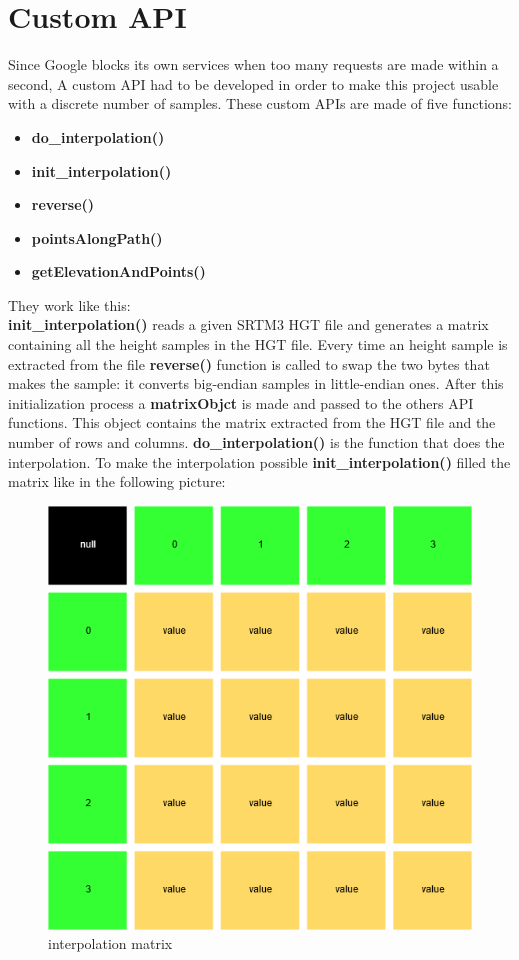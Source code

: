 \documentclass[peerreview]{IEEEtran}
\begin{document}
\section{Custom API}
Since Google blocks its own services when too many requests are made within a second, A custom API had to be developed in order to make this project usable with a discrete number of samples.
These custom APIs are made of five functions:
\begin{itemize}
\item \textbf{do\_interpolation()}
\item \textbf{init\_interpolation()}
\item \textbf{reverse()}
\item \textbf{pointsAlongPath()}
\item \textbf{getElevationAndPoints()}
\end{itemize}
They work like this:\\
\textbf{init\_interpolation()} reads a given SRTM3 HGT file and generates a matrix containing all the height samples in the HGT file. Every time an height sample is extracted from the file \textbf{reverse()} function is called to swap the two bytes that makes the sample: it converts big-endian samples in little-endian ones. After this initialization process a \textbf{matrixObjct} is made and passed to the others API functions. This object contains the matrix extracted from the HGT file and the number of rows and columns.
\textbf{do\_interpolation()} is the function that does the interpolation. To make the interpolation possible \textbf{init\_interpolation()} filled the matrix like in the following picture:
\begin{figure}[!ht]
\centering
\includegraphics[width=1\columnwidth]{interpolationMatrix} 
\caption{interpolation matrix}
\label{fig_interpolationMatrix}
\end{figure}
\end{document}
